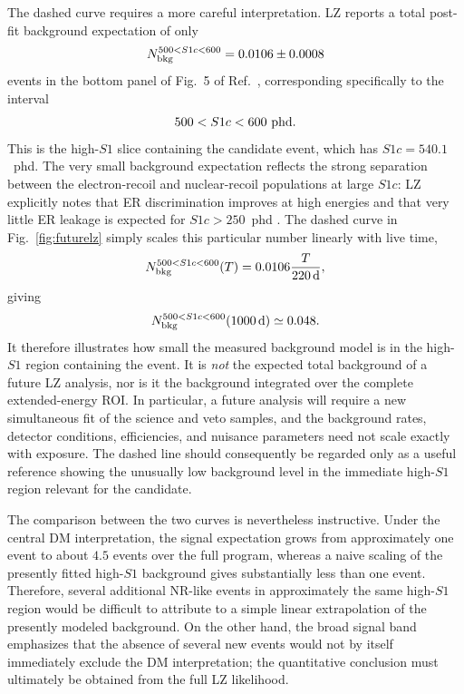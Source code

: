 \documentclass[aps,prd,reprint,superscriptaddress,nofootinbib,longbibliography,floatfix]{revtex4-2}
\begin{document}
The dashed curve requires a more careful interpretation. LZ reports a total post-fit background expectation of only
\begin{equation}
N_{\rm bkg}^{500<S1c<600}
=
0.0106\pm0.0008
\end{equation}
events in the bottom panel of Fig.~5 of Ref.~\cite{LZ2026Extended}, corresponding specifically to the interval
\begin{equation}
500<S1c<600~{\rm phd}.
\end{equation}
This is the high-$S1$ slice containing the candidate event, which has $S1c=540.1$~phd. The very small background expectation reflects the strong separation between the electron-recoil and nuclear-recoil populations at large $S1c$: LZ explicitly notes that ER discrimination improves at high energies and that very little ER leakage is expected for $S1c>250$~phd \cite{LZ2026Extended}. The dashed curve in Fig.~\ref{fig:futurelz} simply scales this particular number linearly with live time,
\begin{equation}
N_{\rm bkg}^{500<S1c<600}(T)
=
0.0106
\frac{T}{220\,{\rm d}},
\end{equation}
giving
\begin{equation}
N_{\rm bkg}^{500<S1c<600}(1000\,{\rm d})
\simeq
0.048.
\end{equation}
It therefore illustrates how small the measured background model is in the high-$S1$ region containing the event. It is \emph{not} the expected total background of a future LZ analysis, nor is it the background integrated over the complete extended-energy ROI. In particular, a future analysis will require a new simultaneous fit of the science and veto samples, and the background rates, detector conditions, efficiencies, and nuisance parameters need not scale exactly with exposure. The dashed line should consequently be regarded only as a useful reference showing the unusually low background level in the immediate high-$S1$ region relevant for the candidate.

The comparison between the two curves is nevertheless instructive. Under the central DM interpretation, the signal expectation grows from approximately one event to about $4.5$ events over the full program, whereas a naive scaling of the presently fitted high-$S1$ background gives substantially less than one event. Therefore, several additional NR-like events in approximately the same high-$S1$ region would be difficult to attribute to a simple linear extrapolation of the presently modeled background. On the other hand, the broad signal band emphasizes that the absence of several new events would not by itself immediately exclude the DM interpretation; the quantitative conclusion must ultimately be obtained from the full LZ likelihood.
\end{document}
